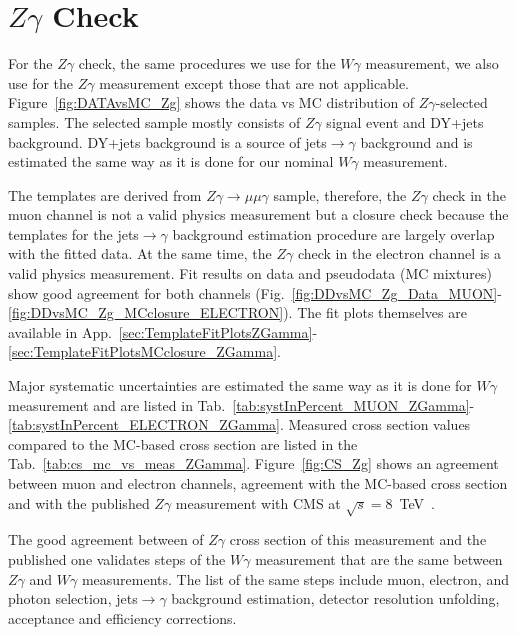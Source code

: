\chapter{$Z\gamma$ Check}
\label{sec:ZgCheck}

For the $Z\gamma$ check, the same procedures we use for the $W\gamma$ measurement, we also use for the $Z\gamma$ measurement except those that are not applicable. Figure~\ref{fig:DATAvsMC_Zg} shows the data vs MC distribution of $Z\gamma$-selected samples. The selected sample mostly consists of $Z\gamma$ signal event and DY+jets background. DY+jets background is a source of jets$\rightarrow\gamma$ background and is estimated the same way as it is done for our nominal $W\gamma$ measurement.  

The templates are derived from $Z\gamma\rightarrow\mu\mu\gamma$ sample, therefore, the $Z\gamma$ check in the muon channel is not a valid physics measurement but a closure check because the templates for the jets$\rightarrow\gamma$ background estimation procedure are largely overlap with the fitted data. At the same time, the $Z\gamma$ check in the electron channel is a valid physics measurement. Fit results on data and pseudodata (MC mixtures) show good agreement for both channels (Fig.~\ref{fig:DDvsMC_Zg_Data_MUON}-\ref{fig:DDvsMC_Zg_MCclosure_ELECTRON}). The fit plots themselves are available in App.~\ref{sec:TemplateFitPlotsZGamma}-\ref{sec:TemplateFitPlotsMCclosure_ZGamma}.

Major systematic uncertainties are estimated the same way as it is done for $W\gamma$ measurement and are listed in Tab.~\ref{tab:systInPercent_MUON_ZGamma}-\ref{tab:systInPercent_ELECTRON_ZGamma}. Measured cross section values compared to the MC-based cross section are listed in the Tab.~\ref{tab:cs_mc_vs_meas_ZGamma}. Figure~\ref{fig:CS_Zg} shows an agreement between muon and electron channels, agreement with the MC-based cross section and with the published $Z\gamma$ measurement with CMS at $\sqrt{s}=$8~TeV~\cite{ref_Zg8TeV}.

 The good agreement between of $Z\gamma$ cross section of this measurement and the published one validates steps of the $W\gamma$ measurement that are the same between $Z\gamma$ and $W\gamma$ measurements. The list of the same steps include muon, electron, and photon selection, jets$\rightarrow\gamma$ background estimation, detector resolution unfolding, acceptance and efficiency corrections.



